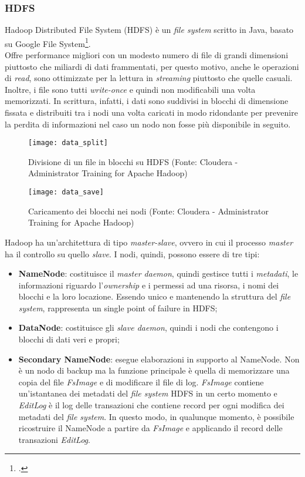 \subsubsection{HDFS}
Hadoop Distributed File System (HDFS) è un \textit{file system} scritto in Java, basato su Google File System\footcite{https://ai.google/research/pubs/pub51}. \\
Offre performance migliori con un modesto numero di file di grandi dimensioni piuttosto che miliardi di dati frammentati, per questo motivo, anche le operazioni di \textit{read}, sono ottimizzate per la lettura in \textit{streaming} piuttosto che quelle casuali. Inoltre, i file sono tutti \textit{write-once} e quindi non modificabili una volta memorizzati.
In scrittura, infatti, i dati sono suddivisi in blocchi di dimensione fissata e distribuiti tra i nodi una volta caricati in modo ridondante per prevenire la perdita di informazioni nel caso un nodo non fosse più disponibile in seguito.
\begin{figure}[!h]
	\centering
	\texttt{[image: data\_split]}
	\caption{Divisione di un file in blocchi su HDFS (Fonte: Cloudera - Administrator Training for Apache Hadoop)}
\end{figure}
\clearpage
\begin{figure}[!h]
	\centering
	\texttt{[image: data\_save]}
	\caption{Caricamento dei blocchi nei nodi (Fonte: Cloudera - Administrator Training for Apache Hadoop)}
\end{figure}
Hadoop ha un'architettura di tipo \textit{master-slave}, ovvero in cui il processo \textit{master} ha il controllo su quello \textit{slave}. I nodi, quindi, possono essere di tre tipi:
\begin{itemize}
	\item \textbf{NameNode}: costituisce il \textit{master \gls{daemon}}, quindi gestisce tutti i \textit{metadati}, le informazioni riguardo l'\textit{ownership} e i permessi ad una risorsa, i nomi dei blocchi e la loro locazione. Essendo unico e mantenendo la struttura del \textit{file system}, rappresenta un \gls{single point of failure} in \gls{HDFS};
	\item \textbf{DataNode}: costituisce gli \textit{slave \gls{daemon}}, quindi i nodi che contengono i blocchi di dati veri e propri;
	\item \textbf{Secondary NameNode}: esegue elaborazioni in supporto al NameNode. Non è un nodo di backup ma la funzione principale è quella di memorizzare una copia del file \textit{FsImage} e di modificare il file di log. \textit{FsImage} contiene un'istantanea dei metadati del \textit{file system} HDFS in un certo momento e \textit{EditLog} è il log delle transazioni che contiene record per ogni modifica dei metadati del \textit{file system}. In questo modo, in qualunque momento, è possibile ricostruire il NameNode a partire da \textit{FsImage} e applicando il record delle transazioni \textit{EditLog}.
\end{itemize}
